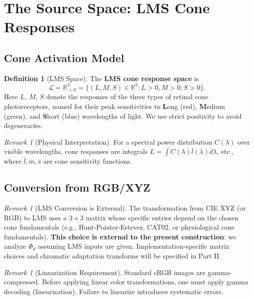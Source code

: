\documentclass[11pt]{article}
\theoremstyle{plain}
\theoremstyle{definition}
\newtheorem{definition}[theorem]{Definition}
\theoremstyle{remark}
\newtheorem{remark}[theorem]{Remark}
\newcommand{\R}{\mathbb{R}}
\newcommand{\Rpp}{\mathbb{R}_{> 0}}     %
\begin{document}
\section{The Source Space: LMS Cone Responses}
\label{sec:source}

\subsection{Cone Activation Model}

\begin{definition}[LMS Space]
The \textbf{LMS cone response space} is
\begin{equation}
\mathcal{L} = \Rpp^3 = \{ (L, M, S) \in \R^3 : L > 0, M > 0, S > 0 \}.
\end{equation}
Here $L$, $M$, $S$ denote the responses of the three types of retinal cone photoreceptors, named for their peak sensitivities to \textbf{L}ong (red), \textbf{M}edium (green), and \textbf{S}hort (blue) wavelengths of light. We use strict positivity to avoid degeneracies.
\end{definition}

\begin{remark}[Physical Interpretation]
For a spectral power distribution $C(\lambda)$ over visible wavelengths, cone responses are integrals $L = \int C(\lambda) \bar{l}(\lambda) d\lambda$, etc., where $\bar{l}, \bar{m}, \bar{s}$ are cone sensitivity functions.
\end{remark}

\subsection{Conversion from RGB/XYZ}

\begin{remark}[LMS Conversion is External]
\label{rem:lms-external}
The transformation from CIE XYZ (or RGB) to LMS uses a $3 \times 3$ matrix whose specific entries depend on the chosen cone fundamentals (e.g., Hunt-Pointer-Estevez, CAT02, or physiological cone fundamentals). \textbf{This choice is external to the present construction}: we analyze $\Phi_\theta$ assuming LMS inputs are given. Implementation-specific matrix choices and chromatic adaptation transforms will be specified in Part II.
\end{remark}

\begin{remark}[Linearization Requirement]
\label{rem:linearization}
Standard sRGB images are gamma-compressed. Before applying linear color transformations, one must apply gamma decoding (linearization). Failure to linearize introduces systematic errors.
\end{remark}
\end{document}
